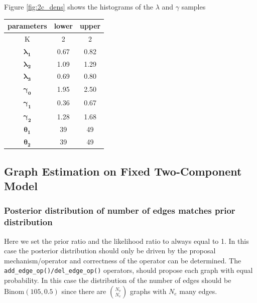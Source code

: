 \documentclass[11pt,a4paper]{article}
\numberwithin{equation}{section}
\begin{document}
Figure \ref{fig:2c_dens} shows the histograms of the \(\lambda\) and
\(\gamma\) samples

\begin{longtable}[]{@{}ccc@{}}
\toprule
parameters & lower & upper\tabularnewline
\midrule
\endhead
K & 2 & 2\tabularnewline
\(\boldsymbol{\lambda_1}\) & 0.67 & 0.82\tabularnewline
\(\boldsymbol{\lambda_2}\) & 1.09 & 1.29\tabularnewline
\(\boldsymbol{\lambda_3}\) & 0.69 & 0.80\tabularnewline
\(\boldsymbol{\gamma_0}\) & 1.95 & 2.50\tabularnewline
\(\boldsymbol{\gamma_1}\) & 0.36 & 0.67\tabularnewline
\(\boldsymbol{\gamma_2}\) & 1.28 & 1.68\tabularnewline
\(\boldsymbol{\theta_1}\) & 39 & 49\tabularnewline
\(\boldsymbol{\theta_2}\) & 39 & 49\tabularnewline
\bottomrule
\end{longtable}

\pagebreak

\hypertarget{graph-estimation-on-fixed-two-component-model}{%
\subsection{Graph Estimation on Fixed Two-Component
Model}\label{graph-estimation-on-fixed-two-component-model}}

\hypertarget{posterior-distribution-of-number-of-edges-matches-prior-distribution}{%
\subsubsection{Posterior distribution of number of edges matches prior
distribution}\label{posterior-distribution-of-number-of-edges-matches-prior-distribution}}

Here we set the prior ratio and the likelihood ratio to always equal to
1. In this case the posterior distribution should only be driven by the
proposal mechanism/operator and correctness of the operator can be
determined. The \texttt{add\_edge\_op()/del\_edge\_op()} operators,
should propose each graph with equal probability. In this case the
distribution of the number of edges should be \(\text{Binom}(105, 0.5)\)
since there are \(\binom{N_v}{N_e}\) graphs with \(N_e\) many edges.
\end{document}
